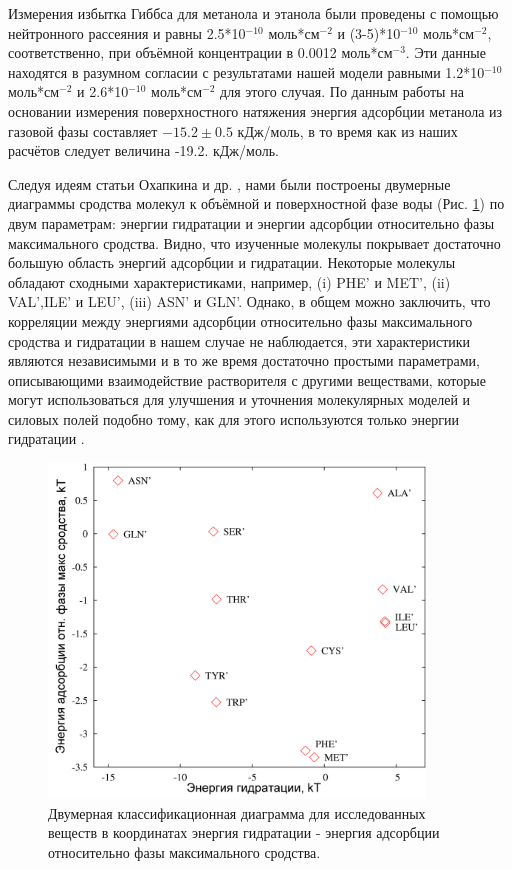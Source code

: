 Измерения избытка Гиббса для метанола и этанола были проведены с помощью нейтронного рассеяния \cite{eth-excess-exp,meth-excess-exp} и равны  2.5*10$^{-10}$ моль*см$^{-2}$ и (3-5)*10$^{-10}$ моль*см$^{-2}$, соответственно, при объёмной концентрации в 0.0012 моль*см$^{-3}$. Эти данные находятся в разумном согласии с результатами нашей модели равными 1.2*10$^{-10}$ моль*см$^{-2}$ и 2.6*10$^{-10}$ моль*см$^{-2}$ для этого случая. По данным работы \cite{atmgas_excess-exp} на основании измерения поверхностного натяжения энергия адсорбции метанола из газовой фазы составляет $-15.2\pm0.5$ кДж/моль, в то время как из наших расчётов следует величина -19.2. кДж/моль.


Следуя идеям статьи Охапкина и др. \cite{okhapkin_amino}, нами были построены двумерные диаграммы сродства молекул к объёмной и поверхностной фазе воды (Рис. \ref{diagr}) по двум параметрам: энергии гидратации и энергии адсорбции относительно фазы максимального сродства. Видно, что изученные молекулы покрывает достаточно большую область энергий адсорбции и гидратации. Некоторые молекулы обладают сходными характеристиками, например, (i) PHE' и MET', (ii) VAL',ILE' и LEU',  (iii) ASN' и GLN'. Однако, в общем можно заключить, что корреляции между энергиями адсорбции относительно фазы максимального сродства и гидратации в нашем случае не наблюдается, эти характеристики являются независимыми и в то же время достаточно простыми параметрами, описывающими взаимодействие растворителя с другими веществами, которые могут использоваться для улучшения и уточнения молекулярных моделей и силовых полей подобно тому, как для этого используются только энергии гидратации \cite{gromos_hydr}.

\begin{figure}
\centering
\includegraphics[width=10cm]{diagr}
\caption{\label{diagr} Двумерная классификационная диаграмма для исследованных веществ в координатах энергия гидратации - энергия адсорбции относительно фазы максимального сродства.}
\end{figure}

